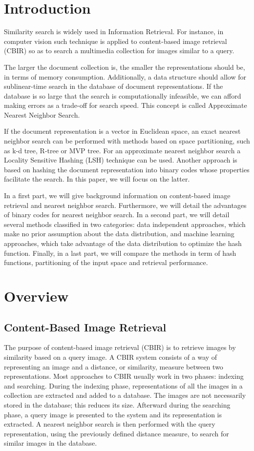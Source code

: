 \section{Introduction}
Similarity search is widely used in Information Retrieval. For instance, in computer vision such technique is applied to content-based image retrieval (CBIR) so as to search a multimedia collection for images similar to a query.

The larger the document collection is, the smaller the representations should be, in terms of memory consumption. Additionally, a data structure should allow for sublinear-time search in the database of document representations. If the database is so large that the search is computationally infeasible, we can afford making errors as a trade-off for search speed. This concept is called Approximate Nearest Neighbor Search.

If the document representation is a vector in Euclidean space, an exact nearest neighbor search can be performed with methods based on space partitioning, such as k-d tree, R-tree or MVP tree. For an approximate nearest neighbor search a Locality Sensitive Hashing (LSH) technique can be used. Another approach is based on hashing the document representation into binary codes whose properties facilitate the search. In this paper, we will focus on the latter.

In a first part, we will give background information on content-based image retrieval and nearest neighbor search. Furthermore, we will detail the advantages of binary codes for nearest neighbor search. In a second part, we will detail several methods classified in two categories: data independent approaches, which make no prior assumption about the data distribution, and machine learning approaches, which take advantage of the data distribution to optimize the hash function. Finally, in a last part, we will compare the methods in term of hash functions, partitioning of the input space and retrieval performance.

\section{Overview}

\subsection{Content-Based Image Retrieval}
The purpose of content-based image retrieval (CBIR) is to retrieve images by similarity based on a query image. A CBIR system consists of a way of representing an image and a distance, or similarity, measure between two representations. Most approaches to CBIR usually work in two phases: indexing and searching. During the indexing phase, representations of all the images in a collection are extracted and added to a database. The images are not necessarily stored in the database; this reduces its size. Afterward during the searching phase, a query image is presented to the system and its representation is extracted. A nearest neighbor search is then performed with the query representation, using the previously defined distance measure, to search for similar images in the database.

